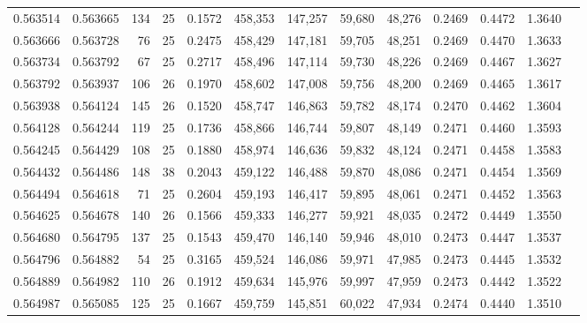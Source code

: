 \begin{tabular}{rrrrrrrrrrrrr}
0.563514 & 0.563665 & 134 &  25 &                                     0.1572 & 458,353 & 147,257 &  59,680 &  48,276 & 0.2469 & 0.4472 & 1.3640 \\
0.563666 & 0.563728 &  76 &  25 &                                     0.2475 & 458,429 & 147,181 &  59,705 &  48,251 & 0.2469 & 0.4470 & 1.3633 \\
0.563734 & 0.563792 &  67 &  25 &                                     0.2717 & 458,496 & 147,114 &  59,730 &  48,226 & 0.2469 & 0.4467 & 1.3627 \\
0.563792 & 0.563937 & 106 &  26 &                                     0.1970 & 458,602 & 147,008 &  59,756 &  48,200 & 0.2469 & 0.4465 & 1.3617 \\
0.563938 & 0.564124 & 145 &  26 &                                     0.1520 & 458,747 & 146,863 &  59,782 &  48,174 & 0.2470 & 0.4462 & 1.3604 \\
0.564128 & 0.564244 & 119 &  25 &                                     0.1736 & 458,866 & 146,744 &  59,807 &  48,149 & 0.2471 & 0.4460 & 1.3593 \\
0.564245 & 0.564429 & 108 &  25 &                                     0.1880 & 458,974 & 146,636 &  59,832 &  48,124 & 0.2471 & 0.4458 & 1.3583 \\
0.564432 & 0.564486 & 148 &  38 &                                     0.2043 & 459,122 & 146,488 &  59,870 &  48,086 & 0.2471 & 0.4454 & 1.3569 \\
0.564494 & 0.564618 &  71 &  25 &                                     0.2604 & 459,193 & 146,417 &  59,895 &  48,061 & 0.2471 & 0.4452 & 1.3563 \\
0.564625 & 0.564678 & 140 &  26 &                                     0.1566 & 459,333 & 146,277 &  59,921 &  48,035 & 0.2472 & 0.4449 & 1.3550 \\
0.564680 & 0.564795 & 137 &  25 &                                     0.1543 & 459,470 & 146,140 &  59,946 &  48,010 & 0.2473 & 0.4447 & 1.3537 \\
0.564796 & 0.564882 &  54 &  25 &                                     0.3165 & 459,524 & 146,086 &  59,971 &  47,985 & 0.2473 & 0.4445 & 1.3532 \\
0.564889 & 0.564982 & 110 &  26 &                                     0.1912 & 459,634 & 145,976 &  59,997 &  47,959 & 0.2473 & 0.4442 & 1.3522 \\
0.564987 & 0.565085 & 125 &  25 &                                     0.1667 & 459,759 & 145,851 &  60,022 &  47,934 & 0.2474 & 0.4440 & 1.3510 \\

\end{tabular}
